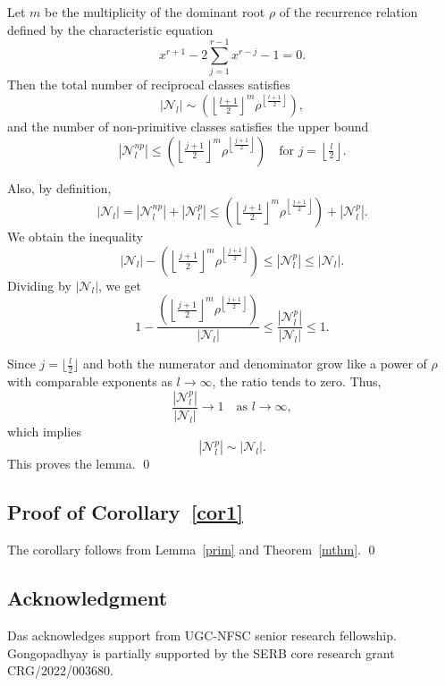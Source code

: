\documentclass[11pt]{amsart}
\renewenvironment{proof}{{\bfseries Proof.}}{\qed}
\numberwithin{equation}{section}
\theoremstyle{definition}
\newcommand{\thmref}[1]{Theorem~\ref{#1}}
\newcommand{\lemref}[1]{Lemma~\ref{#1}}
\newcommand{\corref}[1]{Corollary~\ref{#1}}
\numberwithin{equation}{section}
\begin{document}
	\begin{proof}
		Let $m$ be the multiplicity of the dominant root $\rho$ of the recurrence relation defined by the characteristic equation \[x^{r+1} - 2\sum_{j=1}^{r-1} x^{r-j} - 1 = 0.\]Then the total number of reciprocal classes satisfies
		\[
		|\mathcal{N}_{l}| \sim \left(\left\lfloor \tfrac{l+1}{2} \right\rfloor^{m} \rho^{\left\lfloor \tfrac{l+1}{2} \right\rfloor} \right),
		\]
		and the number of non-primitive classes satisfies the upper bound
		\[
		|\mathcal{N}^{np}_{l}| \leq \left(\left\lfloor \tfrac{j+1}{2} \right\rfloor^{m} \rho^{\left\lfloor \tfrac{j+1}{2} \right\rfloor} \right)
		\quad \text{for } j = \left\lfloor \tfrac{l}{2} \right\rfloor.
		\]
	
		Also, by definition,
		\[
		|\mathcal{N}_{l}| = |\mathcal{N}^{np}_{l}| + |\mathcal{N}^{p}_{l}| \leq \left(\left\lfloor \tfrac{j+1}{2} \right\rfloor^{m} \rho^{\left\lfloor \tfrac{j+1}{2} \right\rfloor} \right) + |\mathcal{N}^{p}_{l}|.
		\]
		We obtain the inequality
		\[
		|\mathcal{N}_{l}| - \left(\left\lfloor \tfrac{j+1}{2} \right\rfloor^{m} \rho^{\left\lfloor \tfrac{j+1}{2} \right\rfloor} \right) \leq |\mathcal{N}^{p}_{l}| \leq |\mathcal{N}_{l}|.
		\]
		Dividing by $|\mathcal{N}_{l}|$, we get
		\[
		1 - \frac{\left(\left\lfloor \tfrac{j+1}{2} \right\rfloor^{m} \rho^{\left\lfloor \tfrac{j+1}{2} \right\rfloor} \right)}{|\mathcal{N}_{l}|}
		\leq \frac{|\mathcal{N}^{p}_{l}|}{|\mathcal{N}_{l}|} \leq 1.
		\]
		
		Since \( j = \lfloor \tfrac{l}{2} \rfloor \) and both the numerator and denominator grow like a power of $\rho$ with comparable exponents as \( l \to \infty \), the ratio tends to zero. Thus,
		\[
		\frac{|\mathcal{N}^{p}_{l}|}{|\mathcal{N}_{l}|} \to 1 \quad \text{as } l \to \infty,
		\]
		which implies
		\[
		|\mathcal{N}^{p}_{l}| \sim |\mathcal{N}_{l}|.
		\]
    This proves the lemma. 
	\end{proof}

\subsection{Proof of \corref{cor1}}
	The corollary follows from \lemref{prim} and \thmref{mthm}. \qed
		
		
		\subsection*{Acknowledgment} 
		Das acknowledges support from UGC-NFSC senior research fellowship. Gongopadhyay is partially supported by the SERB core research grant CRG/2022/003680.
		
\end{document}
